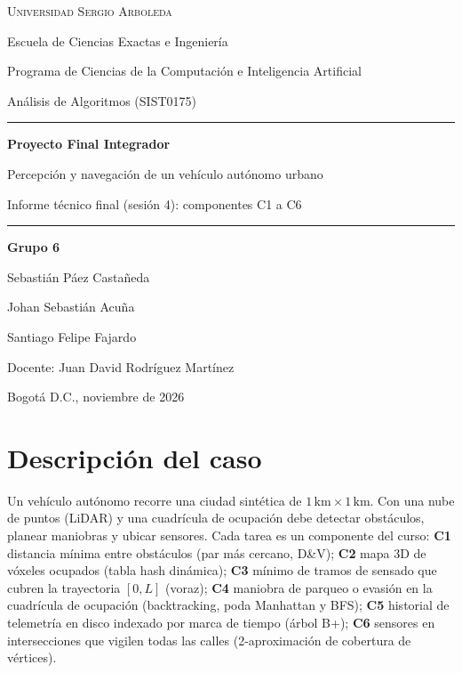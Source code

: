 \documentclass[11pt,letterpaper]{article}
\theoremstyle{plain}
\theoremstyle{definition}
\begin{document}
\begin{titlepage}
\thispagestyle{empty}
\centering
{\large\textsc{Universidad Sergio Arboleda}\par}
\vspace{2mm}
{\normalsize Escuela de Ciencias Exactas e Ingeniería\par}
{\normalsize Programa de Ciencias de la Computación e Inteligencia Artificial\par}
\vspace{2.2cm}
{\large Análisis de Algoritmos (SIST0175)\par}
\vspace{6mm}
{\color{azul}\rule{0.7\linewidth}{0.8pt}\par}
\vspace{4mm}
{\LARGE\bfseries Proyecto Final Integrador\par}
\vspace{3mm}
{\Large Percepción y navegación de un vehículo autónomo urbano\par}
\vspace{3mm}
{\large Informe técnico final (sesión 4): componentes C1 a C6\par}
{\color{azul}\rule{0.7\linewidth}{0.8pt}\par}
\vspace{2.2cm}
{\large\bfseries Grupo 6\par}
\vspace{3mm}
{\large Sebastián Páez Castañeda\par
Johan Sebastián Acuña\par
Santiago Felipe Fajardo\par}
\vspace{1.8cm}
{\normalsize Docente: Juan David Rodríguez Martínez\par}
\vfill
{\normalsize Bogotá D.C., noviembre de 2026\par}
\end{titlepage}

\setcounter{tocdepth}{1}
{\small\tableofcontents}
\vspace{2mm}
\section{Descripción del caso}

Un vehículo autónomo recorre una ciudad sintética de $1\,\text{km}\times1\,\text{km}$. Con una nube de
puntos (LiDAR) y una cuadrícula de ocupación debe detectar obstáculos, planear maniobras y ubicar
sensores. Cada tarea es un componente del curso:
\textbf{C1} distancia mínima entre obstáculos (par más cercano, D\&V);
\textbf{C2} mapa 3D de vóxeles ocupados (tabla hash dinámica);
\textbf{C3} mínimo de tramos de sensado que cubren la trayectoria $[0,L]$ (voraz);
\textbf{C4} maniobra de parqueo o evasión en la cuadrícula de ocupación (backtracking, poda Manhattan y BFS);
\textbf{C5} historial de telemetría en disco indexado por marca de tiempo (árbol B+);
\textbf{C6} sensores en intersecciones que vigilen todas las calles (2-aproximación de cobertura de vértices).
\end{document}
